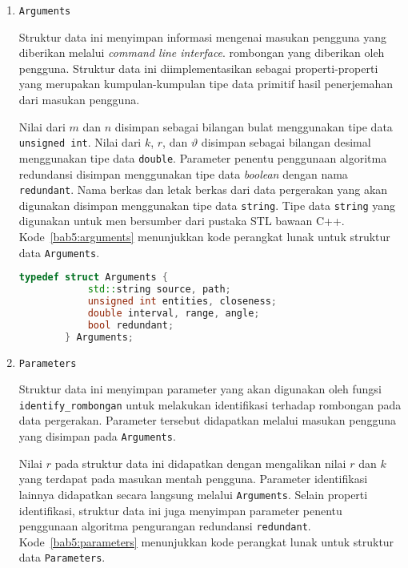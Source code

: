 \begin{enumerate}
    \item \texttt{Arguments}
    
    Struktur data ini menyimpan informasi mengenai masukan pengguna yang diberikan melalui \textit{command line interface}. rombongan yang diberikan oleh pengguna. Struktur data ini diimplementasikan sebagai properti-properti yang merupakan kumpulan-kumpulan tipe data primitif hasil penerjemahan dari masukan pengguna.
    
    Nilai dari $m$ dan $n$ disimpan sebagai bilangan bulat menggunakan tipe data \texttt{unsigned int}. Nilai dari $k$, $r$, dan $\vartheta$ disimpan sebagai bilangan desimal menggunakan tipe data \texttt{double}. Parameter penentu penggunaan algoritma redundansi disimpan menggunakan tipe data \textit{boolean} dengan nama \texttt{redundant}. Nama berkas dan letak berkas dari data pergerakan yang akan digunakan disimpan menggunakan tipe data \texttt{string}. Tipe data \texttt{string} yang digunakan untuk men bersumber dari pustaka STL bawaan C++. Kode~\ref{bab5:arguments} menunjukkan kode perangkat lunak untuk struktur data \texttt{Arguments}. 
    
    \begin{lstlisting}[language=C++, caption=Implementasi \texttt{Arguments}, label={bab5:arguments}]
        typedef struct Arguments {
            std::string source, path;
            unsigned int entities, closeness;
            double interval, range, angle;
            bool redundant;
        } Arguments;
    \end{lstlisting}
    
    \item \texttt{Parameters}
    
    Struktur data ini menyimpan parameter yang akan digunakan oleh fungsi \texttt{identify\_rombongan} untuk melakukan identifikasi terhadap rombongan pada data pergerakan. Parameter tersebut didapatkan melalui masukan pengguna yang disimpan pada \texttt{Arguments}.
    
    Nilai $r$ pada struktur data ini didapatkan dengan mengalikan nilai $r$ dan $k$ yang terdapat pada masukan mentah pengguna. Parameter identifikasi lainnya didapatkan secara langsung melalui \texttt{Arguments}. Selain properti identifikasi, struktur data ini juga menyimpan parameter penentu penggunaan algoritma pengurangan redundansi \texttt{redundant}. Kode~\ref{bab5:parameters} menunjukkan kode perangkat lunak untuk struktur data \texttt{Parameters}.
    

\end{enumerate}
